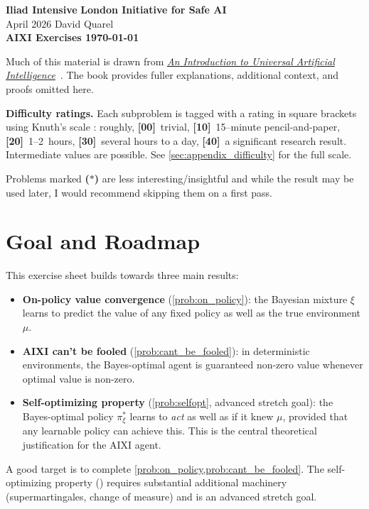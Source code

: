 \documentclass[fontsize=11pt, parskip=half]{scrartcl}
\theoremstyle{definition}
\newcommand{\mytitle}[1]{{\noindent\Large\textbf{#1}}}
\begin{document}
\noindent\textbf{Iliad Intensive} \hfill \textbf{London Initiative for Safe AI}\\
April 2026 \hfill David Quarel\\

\mytitle{AIXI Exercises \hfill \today}

\medskip
\noindent
Much of this material is drawn from \href{https://www.hutter1.net/publ/uaibook2.pdf}{\textit{An Introduction to Universal Artificial Intelligence}}~\cite{Hutter:24uaibook2}. The book provides fuller explanations, additional context, and proofs omitted here.

\medskip
\noindent
\textbf{Difficulty ratings.} Each subproblem is tagged with a rating in square brackets using Knuth's scale \cite{Knuth:73a}: roughly, \textbf{[00]}~trivial, \textbf{[10]}~15--minute pencil-and-paper, \textbf{[20]}~1--2~hours, \textbf{[30]}~several hours to a day, \textbf{[40]}~a significant research result. Intermediate values are possible. See \cref{sec:appendix_difficulty} for the full scale. 

Problems marked \textbf{($\ast$)} are less interesting/insightful and while the result may be used later, I would recommend skipping them on a first pass.

\section*{Goal and Roadmap}

This exercise sheet builds towards three main results:
\begin{itemize}\itemsep=2pt
    \item \textbf{On-policy value convergence} (\cref{prob:on_policy}): the Bayesian mixture $\xi$ learns to predict the value of any fixed policy as well as the true environment $\mu$.
    \item \textbf{AIXI can't be fooled} (\cref{prob:cant_be_fooled}): in deterministic environments, the Bayes-optimal agent is guaranteed non-zero value whenever optimal value is non-zero.
    \item \textbf{Self-optimizing property} (\cref{prob:selfopt}, advanced stretch goal): the Bayes-optimal policy $\pi_\xi^*$ learns to \emph{act} as well as if it knew $\mu$, provided that any learnable policy can achieve this. This is the central theoretical justification for the AIXI agent.
\end{itemize}
A good target is to complete \cref{prob:on_policy,prob:cant_be_fooled}. The self-optimizing property () requires substantial additional machinery (supermartingales, change of measure) and is an advanced stretch goal.
\end{document}
